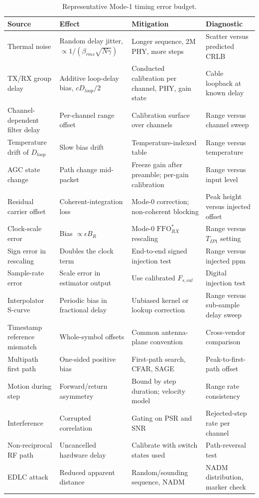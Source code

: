 \documentclass[11pt,a4paper]{article}
\newcommand{\FFO}{\mathrm{FFO}}
\newcommand{\NADM}{\mathrm{NADM}}
\newcommand{\Tip}{T_{IP1}}
\begin{document}
\begin{table}[h]
\caption{Representative Mode-1 timing error budget.}
\label{tab:errors}
\centering\small
\begin{tabular}{@{}L{30mm}L{34mm}L{34mm}L{30mm}@{}}
\toprule
Source & Effect & Mitigation & Diagnostic \\
\midrule
Thermal noise & Random delay jitter, $\propto 1/(\beta_{rms}\sqrt{N\gamma})$ & Longer sequence, 2M PHY, more steps & Scatter versus predicted CRLB \\
TX/RX group delay & Additive loop-delay bias, $c D_{loop}/2$ & Conducted calibration per channel, PHY, gain state & Cable loopback at known delay \\
Channel-dependent filter delay & Per-channel range offset & Calibration surface over channels & Range versus channel sweep \\
Temperature drift of $D_{loop}$ & Slow bias drift & Temperature-indexed table & Range versus temperature \\
AGC state change & Path change mid-packet & Freeze gain after preamble; per-gain calibration & Range versus input level \\
Residual carrier offset & Coherent-integration loss & Mode-0 correction; non-coherent blocking & Peak height versus injected offset \\
Clock-scale error & Bias $\propto \epsilon B_R$ & Mode-0 $\FFO^{*}_{RX}$ rescaling & Range versus $\Tip$ setting \\
Sign error in rescaling & Doubles the clock term & End-to-end signed injection test & Range versus injected ppm \\
Sample-rate error & Scale error in estimator output & Use calibrated $F_{s,cal}$ & Digital injection test \\
Interpolator S-curve & Periodic bias in fractional delay & Unbiased kernel or lookup correction & Range versus sub-sample delay sweep \\
Timestamp reference mismatch & Whole-symbol offsets & Common antenna-plane convention & Cross-vendor comparison \\
Multipath first path & One-sided positive bias & First-path search, CFAR, SAGE & Peak-to-first-path offset \\
Motion during step & Forward/return asymmetry & Bound by step duration; velocity model & Range rate consistency \\
Interference & Corrupted correlation & Gating on PSR and SNR & Rejected-step rate per channel \\
Non-reciprocal RF path & Uncancelled hardware delay & Calibrate with switch states used & Path-reversal test \\
EDLC attack & Reduced apparent distance & Random/sounding sequence, $\NADM$ & $\NADM$ distribution, marker check \\
\bottomrule
\end{tabular}
\end{table}
\end{document}
